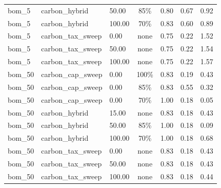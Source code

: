 \begin{table}[!htbp]
\begin{tabular}{lllcccc}
bom\_5 & carbon\_hybrid & 50.00 & 85\% & 0.80 & 0.67 & 0.92 \\
bom\_5 & carbon\_hybrid & 100.00 & 70\% & 0.83 & 0.60 & 0.89 \\
bom\_5 & carbon\_tax\_sweep & 0.00 & none & 0.75 & 0.22 & 1.52 \\
bom\_5 & carbon\_tax\_sweep & 50.00 & none & 0.75 & 0.22 & 1.54 \\
bom\_5 & carbon\_tax\_sweep & 100.00 & none & 0.75 & 0.22 & 1.57 \\
bom\_50 & carbon\_cap\_sweep & 0.00 & 100\% & 0.83 & 0.19 & 0.43 \\
bom\_50 & carbon\_cap\_sweep & 0.00 & 85\% & 0.83 & 0.55 & 0.32 \\
bom\_50 & carbon\_cap\_sweep & 0.00 & 70\% & 1.00 & 0.18 & 0.05 \\
bom\_50 & carbon\_hybrid & 15.00 & none & 0.83 & 0.18 & 0.43 \\
bom\_50 & carbon\_hybrid & 50.00 & 85\% & 1.00 & 0.18 & 0.09 \\
bom\_50 & carbon\_hybrid & 100.00 & 70\% & 1.00 & 0.18 & 0.68 \\
bom\_50 & carbon\_tax\_sweep & 0.00 & none & 0.83 & 0.18 & 0.43 \\
bom\_50 & carbon\_tax\_sweep & 50.00 & none & 0.83 & 0.18 & 0.43 \\
bom\_50 & carbon\_tax\_sweep & 100.00 & none & 0.83 & 0.18 & 0.44 \\
\bottomrule
\end{tabular}
\end{table}
